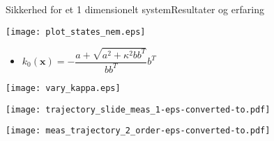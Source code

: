 \begin{frame}{Sikkerhed for et 1 dimensionelt system}{Resultater og erfaring}
\begin{minipage}{0.48\textwidth}
\texttt{[image: plot\_states\_nem.eps]}

\begin{itemize}
	\item \scriptsize $k_0(\textbf{x}) = -\dfrac{a + \sqrt{a^2 + \kappa^2 b b^T}}{b b^T} b^T$
\end{itemize}


\texttt{[image: vary\_kappa.eps]}
\vspace*{-0.4cm}


\end{minipage}
\begin{minipage}{0.48\textwidth}
{\color{white}{white}}
\texttt{[image: trajectory\_slide\_meas\_1-eps-converted-to.pdf]}

\vspace*{0.05cm}
\texttt{[image: meas\_trajectory\_2\_order-eps-converted-to.pdf]}

\end{minipage}
\end{frame}

